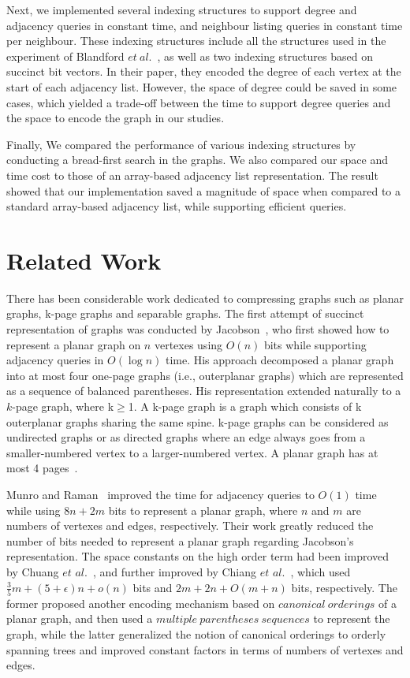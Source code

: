 \documentclass[12pt,glossary]{dalthesis}
\begin{document}
\bigskip
\bigskip

Next, we implemented several indexing structures to support degree and adjacency queries in constant time, and neighbour listing queries in constant time per neighbour. These indexing structures include all the structures used in the experiment of Blandford $et \ al.$~\cite{compact-representation}, as well as two indexing structures based on succinct bit vectors. In their paper, they encoded the degree of each vertex at the start of each adjacency list. However, the space of degree could be saved in some cases, which yielded a trade-off between the time to support degree queries and the space to encode the graph in our studies.

\bigskip
\bigskip

Finally, We compared the performance of various indexing structures by conducting a bread-first search in the graphs. We also compared our space and time cost to those of an array-based adjacency list representation. The result showed that our implementation saved a magnitude of space when compared to a standard array-based adjacency list, while supporting efficient queries.   

\section{Related Work}

There has been considerable work dedicated to compressing graphs such as planar graphs, k-page graphs and separable graphs. The first attempt of succinct representation of graphs was conducted by Jacobson~\cite{Jacobson}, who first showed how to represent a planar graph on $n$ vertexes using $O(n)$ bits while supporting adjacency queries in $O(\log n)$ time. His approach decomposed a planar graph into at most four one-page graphs (i.e., outerplanar graphs) which are represented as a sequence of balanced parentheses. His representation extended naturally to a $k$-page graph, where k$\geq$1. A k-page graph is a graph which consists of k outerplanar graphs sharing the same spine. k-page graphs can be considered as undirected graphs or as directed graphs where an edge always goes from a smaller-numbered vertex to a larger-numbered vertex. A planar graph has at most 4 pages~\cite{k-page-def}. 

\bigskip
\bigskip

Munro and Raman~\cite{Munro} improved the time for adjacency queries to $O(1)$ time while using $8n+2m$ bits to represent a planar graph, where $n$ and $m$ are numbers of vertexes and edges, respectively. Their work greatly reduced the number of bits needed to represent a planar graph regarding Jacobson's representation. The space constants on the high order term had been improved by Chuang $et$ $al.$~\cite{Chuang}, and further improved by Chiang $et$ $al.$~\cite{Chiang}, which used $\frac{3}{5} m + (5+ \epsilon )n + o(n)$ bits and  $2m+2n+O(m+n)$ bits, respectively. The former proposed another encoding mechanism based on $canonical \ orderings$ of a planar graph, and then used a $multiple \ parentheses \ sequences$ to represent the graph, while the latter generalized the notion of canonical orderings to orderly spanning trees and improved constant factors in terms of numbers of vertexes and edges. 
\end{document}
